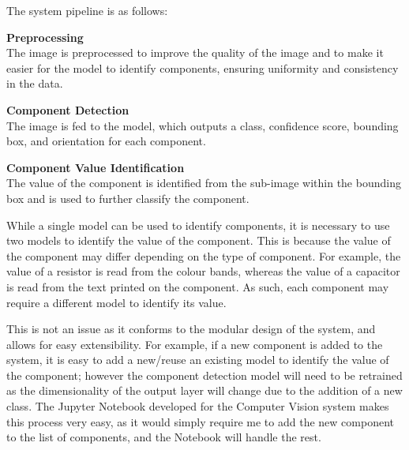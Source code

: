 The system pipeline is as follows:
\begin{mylist}
    \item \textbf{Preprocessing} \\
    The image is preprocessed to improve the quality of the image and to make it easier for the model to identify components, ensuring
    uniformity and consistency in the data.
    \item \textbf{Component Detection} \\
    The image is fed to the model, which outputs a class, confidence score, bounding box, and orientation for each component.
    \item \textbf{Component Value Identification} \\
    The value of the component is identified from the sub-image within the bounding box and is used to further classify the component.
\end{mylist}

While a single model can be used to identify components, it is necessary to use two models to identify the value of the component.
This is because the value of the component may differ depending on the type of component. For example, the value of a resistor
is read from the colour bands, whereas the value of a capacitor is read from the text printed on the component. As such, each
component may require a different model to identify its value.

This is not an issue as it conforms to the modular design of the system, and allows for easy extensibility. For example, if
a new component is added to the system, it is easy to add a new/reuse an existing model to identify the value of the component; however the 
component detection model will need to be retrained as the dimensionality of the output layer will change due to the addition
of a new class. The Jupyter Notebook developed for the Computer Vision system makes this process very easy, as it would simply
require me to add the new component to the list of components, and the Notebook will handle the rest. 